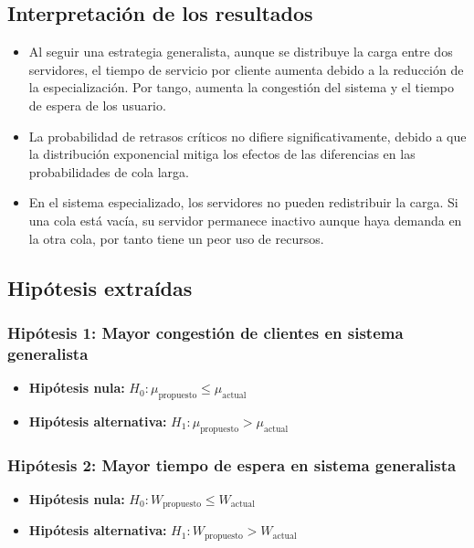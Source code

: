 \documentclass[letterpaper, 12pt]{report}
\begin{document}
\subsection{Interpretación de los resultados}

\begin{itemize}
    \item Al seguir una estrategia generalista, aunque se distribuye la carga entre dos servidores, el tiempo de servicio por cliente aumenta debido
    a la reducci\'on de la especialización. Por tango, aumenta la congestión del sistema y el tiempo de espera de los usuario.
    \item La probabilidad de retrasos críticos no difiere significativamente, debido a que la distribución exponencial mitiga los efectos de las diferencias en las probabilidades de cola larga.
    \item En el sistema especializado, los servidores no pueden redistribuir la carga. Si una cola está vacía, su servidor permanece inactivo aunque haya demanda en la otra cola, por tanto tiene un peor uso de recursos.
\end{itemize}

\subsection{Hipótesis extraídas}

\subsubsection{Hipótesis 1: Mayor congestión de clientes en sistema generalista}
\begin{itemize}
    \item \textbf{Hipótesis nula:} $H_0: \mu_{\text{propuesto}} \leq \mu_{\text{actual}}$ 
    \item \textbf{Hipótesis alternativa:} $H_1: \mu_{\text{propuesto}} > \mu_{\text{actual}}$ 
\end{itemize}

\subsubsection{Hipótesis 2: Mayor tiempo de espera en sistema generalista}
\begin{itemize}
    \item \textbf{Hipótesis nula:} $H_0: W_{\text{propuesto}} \leq W_{\text{actual}}$ 
    \item \textbf{Hipótesis alternativa:} $H_1: W_{\text{propuesto}} > W_{\text{actual}}$ 
\end{itemize}
\end{document}
